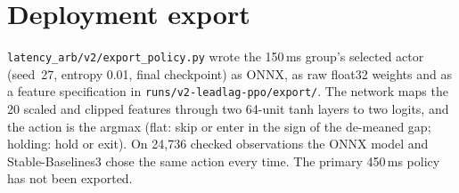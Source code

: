 \documentclass[12pt,a4paper]{article}
\begin{document}
\section{Deployment export}\label{app:export}
\texttt{latency\_arb/v2/export\_policy.py} wrote the 150\,ms group's selected actor (seed~27,
entropy 0.01, final checkpoint) as ONNX, as raw float32 weights and as a feature specification
in \texttt{runs/v2-leadlag-ppo/export/}. The network maps the 20 scaled and clipped features
through two 64-unit tanh layers to two logits, and the action is the argmax (flat: skip or enter
in the sign of the de-meaned gap; holding: hold or exit). On 24,736 checked observations the
ONNX model and Stable-Baselines3 chose the same action every time. The primary 450\,ms policy
has not been exported.
\end{document}

